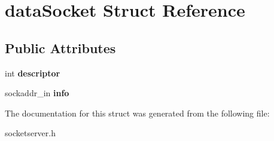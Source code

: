 \hypertarget{structdata_socket}{}\section{data\+Socket Struct Reference}
\label{structdata_socket}
\subsection*{Public Attributes}
\begin{DoxyCompactItemize}
\item 
\mbox{\label{structdata_socket_a65d682c6d429992f4cc2a2b0d7d68097}} 
int {\bfseries descriptor}
\item 
\mbox{\label{structdata_socket_a4cffb4d88ce619e0eb0af09c127ddb58}} 
sockaddr\+\_\+in {\bfseries info}
\end{DoxyCompactItemize}


The documentation for this struct was generated from the following file\+:\begin{DoxyCompactItemize}
\item 
socketserver.\+h\end{DoxyCompactItemize}
